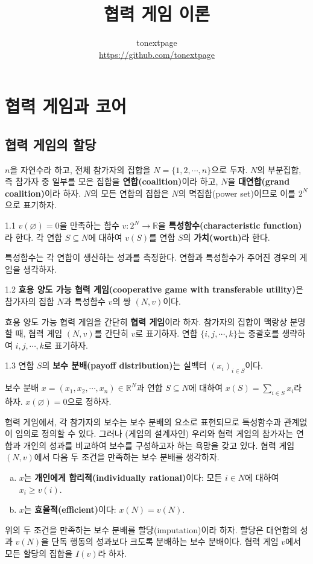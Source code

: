 \documentclass{article}
\title{협력 게임 이론}
\author{tonextpage\\
    \url{https://github.com/tonextpage}
}
\date{}
\numberwithin{equation}{section}
\begin{document}
\maketitle
\tableofcontents
\newpage
\section{협력 게임과 코어}

\subsection{협력 게임의 할당}
$n$을 자연수라 하고, 전체 참가자의 집합을 $N=\{1,2,\cdots,n\}$으로 두자. $N$의 부분집합, 즉 참가자 중 일부를 모은 집합을 \textbf{연합(coalition)}이라 하고, $N$을 \textbf{대연합(grand coalition)}이라 하자. $N$의 모든 연합의 집합은 $N$의 멱집합(power set)이므로 이를 $2^N$으로 표기하자.

\begin{dfn}{}{1.1}
	$v(\varnothing)=0$을 만족하는 함수 $v:2^N\to\mathbb R$을 \textbf{특성함수(characteristic function)}라 한다. 각 연합 $S\subseteq N$에 대하여 $v(S)$를 연합 $S$의 \textbf{가치(worth)}라 한다.
\end{dfn}

특성함수는 각 연합이 생산하는 성과를 측정한다. 연합과 특성함수가 주어진 경우의 게임을 생각하자.

\begin{dfn}{}{1.2}
	\textbf{효용 양도 가능 협력 게임(cooperative game with transferable utility)}은 참가자의 집합 $N$과 특성함수 $v$의 쌍 $(N,v)$이다.
\end{dfn}

\noindent 효용 양도 가능 협력 게임을 간단히 \textbf{협력 게임}이라 하자. 참가자의 집합이 맥랑상 분명할 때, 협력 게임 $(N,v)$를 간단히 $v$로 표기하자. 연합 $\{i,j,\cdots,k\}$는 중괄호를 생략하여 $i,j,\cdots,k$로 표기하자.

\begin{dfn}{}{1.3}
	연합 $S$의 \textbf{보수 분배(payoff distribution)}는 실벡터 $(x_i)_{i\in S}$이다.
\end{dfn}

\noindent 보수 분배 $x=(x_1,x_2,\cdots,x_n)\in\mathbb R^N$과 연합 $S\subseteq N$에 대하여 $x(S)=\sum_{i\in S}x_i$라 하자. $x(\varnothing)=0$으로 정하자.

협력 게임에서, 각 참가자의 보수는 보수 분배의 요소로 표현되므로 특성함수과 관계없이 임의로 정의할 수 있다. 그러나 (게임의 설계자인) 우리와 협력 게임의 참가자는 연합과 개인의 성과를 비교하여 보수를 구성하고자 하는 욕망을 갖고 있다. 협력 게임 $(N,v)$에서 다음 두 조건을 만족하는 보수 분배를 생각하자.
\begin{enumerate}[(a)]
	\item $x$는 \textbf{개인에게 합리적(individually rational)}이다: 모든 $i\in N$에 대하여 $x_i\geq v(i)$.
	\item $x$는 \textbf{효율적(efficient)}이다: $x(N)=v(N)$.
\end{enumerate}
위의 두 조건을 만족하는 보수 분배를 할당(imputation)이라 하자. 할당은 대연합의 성과 $v(N)$을 단독 행동의 성과보다 크도록 분배하는 보수 분배이다. 협력 게임 $v$에서 모든 할당의 집합을 $I(v)$라 하자.
\end{document}
